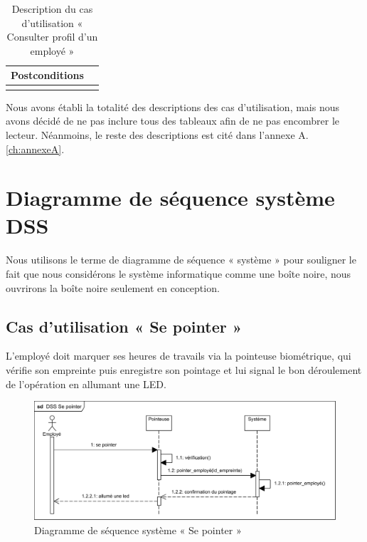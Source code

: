 \begin{longtable}{|p{4cm}|p{12cm}|}
                    \\
                    
                    \hline
                    Postconditions &   \\
                    \hline
                \hline
                \caption{Description du cas d'utilisation « Consulter profil d'un employé »}\\
        \end{longtable}        
        
            
Nous avons établi la totalité des descriptions des cas d’utilisation, mais nous
avons décidé de ne pas inclure tous des tableaux afin de ne pas encombrer le
lecteur. Néanmoins, le reste des descriptions est cité dans l’annexe A.
\ref{ch:annexeA}.  
    
                
\section{Diagramme de séquence système DSS}
Nous utilisons le terme de diagramme de séquence « système » pour souligner le
fait que nous considérons le système informatique comme une boîte noire, nous
ouvrirons la boîte noire seulement en conception.\cite{5}
    
\subsection{Cas d'utilisation « Se pointer »}
L’employé doit marquer ses heures de travails via la pointeuse biométrique, qui
vérifie son empreinte puis enregistre son pointage et lui signal le bon
déroulement de l’opération en allumant une LED.

\clearpage
    \begin{figure}[h!]
         \centering
        \includegraphics[scale=0.9]{images/DSS/DSS Se pointer.png}
         \caption{Diagramme de séquence système « Se pointer »}
         \label{fig4}
    \end{figure}
\vspace{-30pt}

